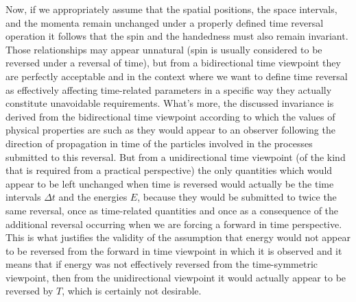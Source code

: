 \documentclass[notitlepage,12pt]{report}
\begin{document}
Now, if we appropriately assume that the spatial positions, the space intervals, and the momenta remain unchanged under a properly defined time reversal operation it follows that the spin and the handedness must also remain invariant. Those relationships may appear unnatural (spin is usually considered to be reversed under a reversal of time), but from a bidirectional time viewpoint they are perfectly acceptable and in the context where we want to define time reversal as effectively affecting time-related parameters in a specific way they actually constitute unavoidable requirements. What's more, the discussed invariance is derived from the bidirectional time viewpoint according to which the values of physical properties are such as they would appear to an observer following the direction of propagation in time of the particles involved in the processes submitted to this reversal. But from a unidirectional time viewpoint (of the kind that is required from a practical perspective) the only quantities which would appear to be left unchanged when time is reversed would actually be the time intervals $\Delta t$ and the energies $E$, because they would be submitted to twice the same reversal, once as time-related quantities and once as a consequence of the additional reversal occurring when we are forcing a forward in time perspective. This is what justifies the validity of the assumption that energy would not appear to be reversed from the forward in time viewpoint in which it is observed and it means that if energy was not effectively reversed from the time-symmetric viewpoint, then from the unidirectional viewpoint it would actually appear to be reversed by $T$, which is certainly not desirable.
\end{document}
